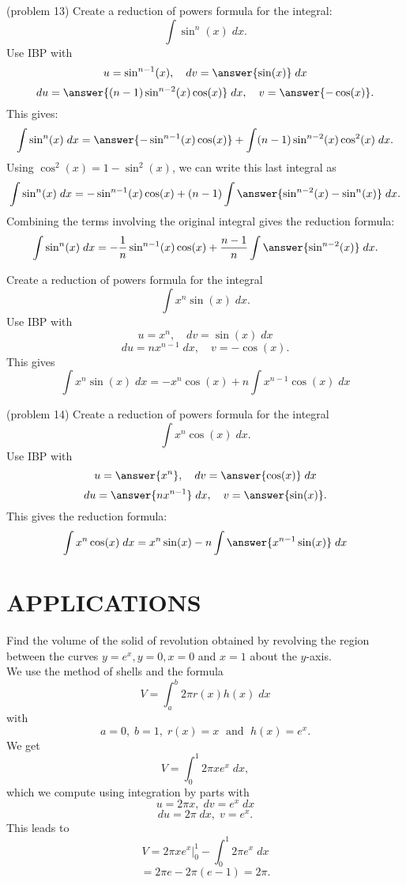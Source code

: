 \documentclass[handout]{ximera}
\begin{document}
\begin{problem}(problem 13)
Create a reduction of powers formula for the integral:
\[
\int \sin^n(x) \; dx.
\]
Use IBP with
\[
u = \sin^{n-1}(x), \quad dv = \answer{\sin(x)} \; dx
\]
\[
du = \answer{(n-1)\sin^{n-2}(x) \cos(x)}\; dx,  \quad v = \answer{-\cos(x)}.
\]
This gives:
\[
\int \sin^n(x) \; dx = \answer{-\sin^{n-1}(x)\cos(x)} + \int (n-1)\sin^{n-2}(x) \cos^2(x) \; dx.
\]
Using $\cos^2(x) = 1 -\sin^2(x)$, we can write this last integral as
\[
\int \sin^n(x) \; dx = -\sin^{n-1}(x)\cos(x) + (n-1)\int \answer{\sin^{n-2}(x)- \sin^n(x)} \; dx.
\]
Combining the terms involving the original integral gives the reduction formula:
\[
\int \sin^n(x) \; dx = -\frac{1}{n}\sin^{n-1}(x)\cos(x) + \frac{n-1}{n}\int \answer{\sin^{n-2}(x)} \; dx.
\]

\end{problem}



\begin{example}[example 14]
Create a reduction of powers formula for the integral
\[
\int x^n\sin(x) \; dx.
\]
Use IBP with
\[
u = x^n, \quad dv = \sin(x) \; dx
\]
\[
du = nx^{n-1}\; dx,  \quad v = -\cos(x).
\]
This gives
\[
\int x^n\sin(x) \; dx = -x^n\cos(x) + n\int x^{n-1}\cos(x) \; dx
\]
\end{example}

\begin{problem}(problem 14)
Create a reduction of powers formula for the integral
\[
\int x^n\cos(x) \; dx.
\]
Use IBP with
\[
u = \answer{x^n}, \quad dv = \answer{\cos(x)} \; dx
\]
\[
du = \answer{nx^{n-1}}\; dx,  \quad v = \answer{\sin(x)}.
\]
This gives the reduction formula:
\[
\int x^n\cos(x) \; dx = x^n\sin(x) - n\int \answer{x^{n-1}\sin(x)} \; dx
\]
\end{problem}




\section{APPLICATIONS}

\begin{example}[example 15]
Find the volume of the solid of revolution obtained by revolving the region between the curves $y = e^x, y = 0, x = 0$
and $x = 1$ about the $y$-axis.\\


We use the method of shells and the formula
\[
V = \int_a^b 2\pi r(x)h(x) \; dx
\]
with
\[
a = 0,\; b = 1, \; r(x) = x \; \text{ and } \; h(x) = e^x.
\]
We get
\[
V = \int_0^1 2\pi xe^x \; dx,
\]
which we compute using integration by parts with
\[
u = 2\pi x, \; dv = e^x \; dx
\]
\[
du = 2\pi \;dx, \; v = e^x.
\]
This leads to 
\[
V = 2\pi xe^x \Big|_0^1 - \int_0^1 2\pi e^x \; dx
\] 
\[
= 2\pi e - 2\pi (e-1) = 2\pi.
\]
\end{example} 
\end{document}
